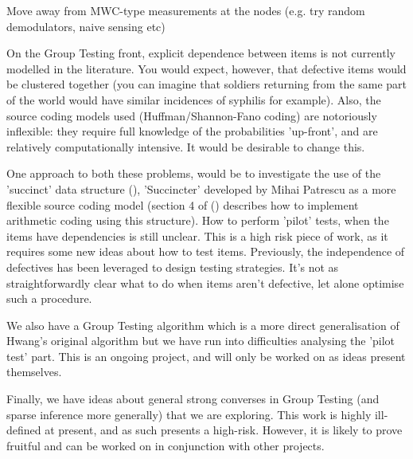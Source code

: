 Move away from MWC-type measurements at the nodes (e.g. try random demodulators, naive sensing etc)

On the Group Testing front, explicit dependence between items is not currently modelled in the literature. You would expect, however, that defective items would be clustered together (you can imagine that soldiers returning from the same part of the world would have similar incidences of syphilis for example). Also, the source coding models used (Huffman/Shannon-Fano coding) are notoriously inflexible: they require full knowledge of the probabilities 'up-front', and are relatively computationally intensive. It would be desirable to change this. 

One approach to both these problems, would be to investigate the use of the 'succinct' data structure (\cite{Patrescu}), 'Succincter' developed by Mihai Patrescu as a more flexible source coding model (section 4 of (\cite{Patrescu}) describes how to implement arithmetic coding using this structure). How to perform 'pilot' tests, when the items have dependencies is still unclear. This is a high risk piece of work, as it requires some new ideas about how to test items. Previously, the independence of defectives has been leveraged to design testing strategies. It's not as straightforwardly clear what to do when items aren't defective, let alone optimise such a procedure.

We also have a Group Testing algorithm which is a more direct generalisation of Hwang's original algorithm but we have run into difficulties analysing the 'pilot test' part. This is an ongoing project, and will only be worked on as ideas present themselves.

Finally, we have ideas about general strong converses in Group Testing (and sparse inference more generally) that we are exploring. This work is highly ill-defined at present, and as such presents a high-risk. However, it is likely to prove fruitful and can be worked on in conjunction with other projects.